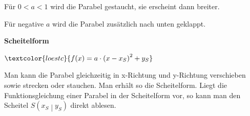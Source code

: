 \textcolor{loes}{Für \(0<a<1\) wird die Parabel gestaucht, sie erscheint dann breiter.}

\textcolor{loes}{Für negative \(a\) wird die Parabel zusätzlich nach unten geklappt.}

\bigskip

\textbf{Scheitelform}\vspace{-.3cm}
\begin{tcolorbox}\centering
	\(\textcolor{loestc}{f(x)=a\cdot \left(x-x_S\right)^2+y_S}\)
\end{tcolorbox}
\textcolor{loes}{Man kann die Parabel gleichzeitig in x-Richtung und y-Richtung verschieben sowie strecken oder stauchen. Man erhält so die Scheitelform. Liegt die Funktionsgleichung einer Parabel in der Scheitelform vor, so kann man den Scheitel \(S\left(x_S\middle\vert y_S \right)\) direkt ablesen.}\newpage
